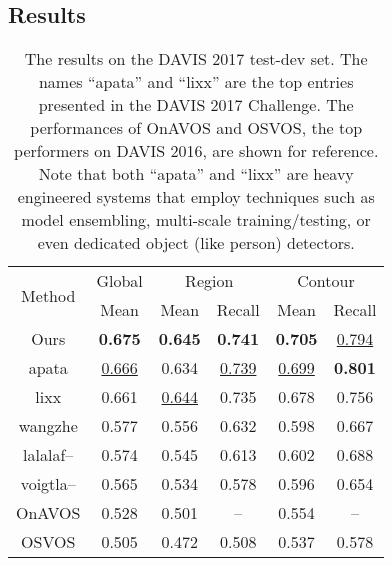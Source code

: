 \documentclass[10pt,twocolumn,letterpaper]{article}
\begin{document}
\subsection{Results}


\begin{table}[t!]\footnotesize
\begin{center}
 \begin{tabular}{cccccc}
\hline
\multirow{2}{*}{Method} & \hspace{6pt}Global\hspace{6pt} & \multicolumn{2}{c}{Region }    & \multicolumn{2}{c}{Contour } \\
    & Mean & Mean & Recall & Mean & Recall \\
\hline
\hline
Ours                                 & \textbf{0.675} & \textbf{0.645} & \textbf{0.741} & \textbf{0.705} & \underline{0.794}\\
apata\cite{DAVIS2017-2nd}            & \underline{0.666} & 0.634 & \underline{0.739} & \underline{0.699} & \textbf{0.801}\\
lixx\cite{DAVIS2017-1st}             & 0.661 & \underline{0.644} & 0.735 & 0.678 & 0.756\\
wangzhe		                         & 0.577 & 0.556 & 0.632 & 0.598 & 0.667\\
lalalaf--		                     & 0.574 & 0.545 & 0.613 & 0.602 & 0.688\\
voigtla--\cite{DAVIS2017-5th}        & 0.565 & 0.534 & 0.578 & 0.596 & 0.654\\
OnAVOS \cite{voigtlaender2017online} & 0.528 & 0.501 &  --   & 0.554 & --   \\
OSVOS \cite{caelles2017one}          & 0.505 & 0.472 & 0.508 & 0.537 & 0.578\\
\hline
\end{tabular}
\end{center}
\vspace{-5mm}
\caption{The results on the DAVIS 2017 test-dev set. The names ``apata'' and ``lixx'' are the top entries presented in the DAVIS 2017 Challenge.
The performances of OnAVOS and OSVOS, the top performers on DAVIS 2016, are shown for reference.
Note that both ``apata'' and ``lixx'' are heavy engineered systems that employ techniques
such as model ensembling, multi-scale training/testing, or even dedicated object (like person) detectors.}
\label{table.davis2017testdevres}
\vspace{-2mm}
\end{table}
\end{document}
